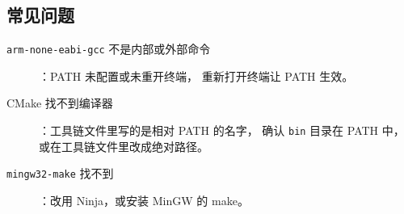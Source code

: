 \subsection{常见问题}

\begin{description}
  \item[\texttt{arm-none-eabi-gcc} 不是内部或外部命令]：PATH 未配置或未重开终端，
        重新打开终端让 PATH 生效。
  \item[CMake 找不到编译器]：工具链文件里写的是相对 PATH 的名字，
        确认 \texttt{bin} 目录在 PATH 中，或在工具链文件里改成绝对路径。
  \item[\texttt{mingw32-make} 找不到]：改用 Ninja，或安装 MinGW 的 make。
\end{description}
